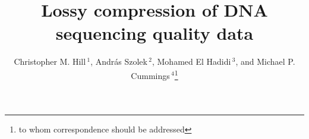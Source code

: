 \documentclass{bioinfo}
\begin{document}

\title[lossy-compression]{Lossy compression of DNA sequencing quality
  data} 
  
\author[Hill \textit{et~al.}]{Christopher M. Hill\,$^{1}$, Andr\'{a}s
  Szolek\,$^{2}$, Mohamed El Hadidi\,$^{3}$, and Michael
  P. Cummings\,$^4$\footnote{to whom correspondence should be
    addressed}} \address{$^{1}$Department of Computer Science,
  University of Maryland, College Park, Maryland, 20742
  USA\\ $^{2}$Department of Applied Bioinformatics, Center for
  Bioinformatics, Quantitative Biology Center, and Department of
  Computer Science, University of T\"{u}bingen, Sand 14, 72076
  T\"{u}bingen, Germany\\ $^{3}$Department of Algorithms in
  Bioinformatics, Center for Bioinformatics, University of
  T\"{u}bingen, Sand 14, 72076 T\"{u}bingen, Germany \\ $^{4}$ Center
  for Bioinformatics and Computational Biology, University of
  Maryland, College Park, Maryland, 20742 USA}



\maketitle
\end{document}
